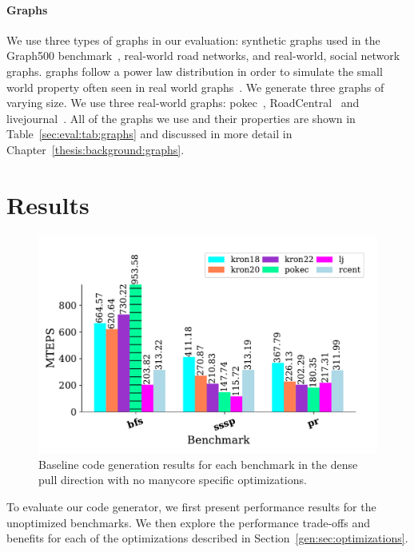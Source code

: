 \paragraph{Graphs} We use three types of graphs in our evaluation: synthetic \kron graphs used in the Graph500 benchmark~\cite{murphy2010graph500}, real-world road networks, and real-world, social network graphs.
\kron graphs follow a power law distribution in order to simulate the small world property often seen in real world graphs~\cite{leskovec2010kronecker}.
We generate three \kron graphs of varying size. 
We use three real-world graphs: pokec~\cite{pokec}, RoadCentral~\cite{davis2011university} and livejournal~\cite{lj}.
All of the graphs we use and their properties are shown in Table~\ref{sec:eval:tab:graphs} and discussed in more detail in Chapter~\ref{thesis:background:graphs}.


\section{Results}
\begin{figure}[h]
    \centering
    \includegraphics[scale = 0.6]{graphit-figures/baseline.pdf}
    \caption{Baseline code generation results for each benchmark in the dense pull direction with no manycore specific optimizations.}
    \label{pap:generals:sec:eval:fig:baseline}
\end{figure}

To evaluate our code generator, we first present performance results for the unoptimized benchmarks. 
We then explore the performance trade-offs and benefits for each of the optimizations described in Section~\ref{gen:sec:optimizations}.

